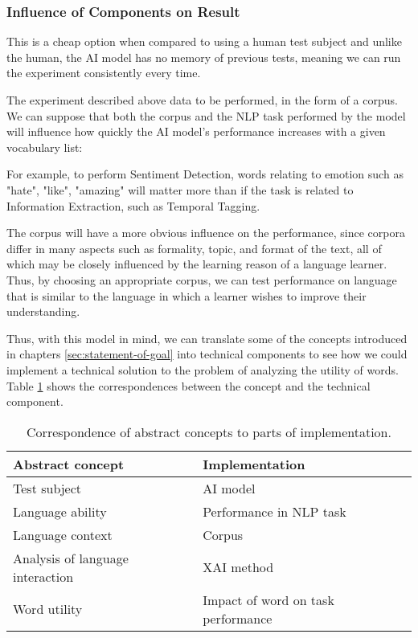 \subsubsection{Influence of Components on Result}
This is a cheap option when compared to using a human test subject and unlike the human, the AI model has no memory of previous tests, meaning we can run the experiment consistently every time.

The experiment described above data to be performed, in the form of a corpus.
We can suppose that both the corpus and the NLP task performed by the model will influence how quickly the AI model's performance increases with a given vocabulary list:

For example, to perform Sentiment Detection, words relating to emotion such as "hate", "like", "amazing" will matter more than if the task is related to Information Extraction, such as Temporal Tagging.

The corpus will have a more obvious influence on the performance, since corpora differ in many aspects such as formality, topic, and format of the text, all of which may be closely influenced by the learning reason of a language learner.
Thus, by choosing an appropriate corpus, we can test performance on language that is similar to the language in which a learner wishes to improve their understanding.



Thus, with this model in mind, we can translate some of the concepts introduced in chapters \ref{sec:statement-of-goal} into technical components to see how we could implement a technical solution to the problem of analyzing the utility of words.
Table \ref{table:concept-implementation-correspondence} shows the correspondences between the concept and the technical component.

\begin{table}[ht]
	\centering
	\begin{tabularx}{\textwidth}{|X|X|}
		\hline
		\textbf{Abstract concept}        & \textbf{Implementation}            \\
		\hline
		Test subject                     & AI model                           \\
		\hline
		Language ability                 & Performance in NLP task            \\
		\hline
		Language context                 & Corpus                             \\
		\hline
		Analysis of language interaction & XAI method                         \\
		\hline
		Word utility                     & Impact of word on task performance \\
		\hline
	\end{tabularx}
	\caption{Correspondence of abstract concepts to parts of implementation.}
	\label{table:concept-implementation-correspondence}
\end{table}


